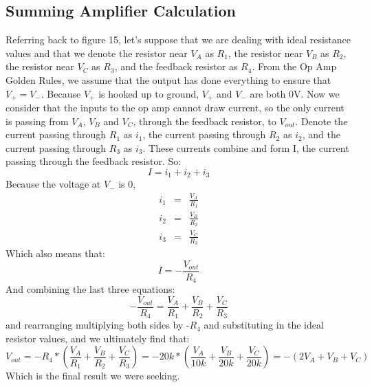 \documentclass{article}
\begin{document}
\subsection{Summing Amplifier Calculation}
    Referring back to figure 15, let's suppose that we are dealing with ideal resistance values and that we denote the resistor near $V_A$ as $R_1$, the resistor near $V_B$ as $R_2$, the resistor near $V_C$ as $R_3$, and the feedback resistor as $R_4$. From the Op Amp Golden Rules, we assume that the output has done everything to ensure that $V_+ = V_-$. Because $V_+$ is hooked up to ground, $V_+$ and $V_-$ are both 0V. Now we consider that the inputs to the op amp cannot draw current, so the only current is passing from $V_A$, $V_B$ and $V_C$, through the feedback resistor, to $V_{out}$. Denote the current passing through $R_1$ as $i_1$, the current passing through $R_2$ as $i_2$, and the current passing through $R_3$ as $i_3$. These currents combine and form I, the current passing through the feedback resistor. So:
    \begin{equation}
        I = i_1 + i_2 + i_3
    \end{equation}
    Because the voltage at $V_-$ is 0,\\
    \begin{equation}
        \begin{array}{lll}
            i_1 & = & \frac{V_A}{R_1}\\
            i_2 & = & \frac{V_B}{R_2}\\
            i_3 & = & \frac{V_C}{R_3}
        \end{array}
    \end{equation}
    Which also means that:
    \begin{equation}
        I = -\frac{V_{out}}{R_4}
    \end{equation}
    And combining the last three equations:
    \begin{equation}
        -\frac{V_{out}}{R_4} = \frac{V_A}{R_1} + \frac{V_B}{R_2} + \frac{V_C}{R_3}
    \end{equation}
    and rearranging multiplying both sides by -$R_4$ and substituting in the ideal resistor values, and we ultimately find that:
    \begin{equation}
        V_{out} = -R_4 * (\frac{V_A}{R_1} + \frac{V_B}{R_2} + \frac{V_C}{R_3}) = -20k * (\frac{V_A}{10k} + \frac{V_B}{20k} + \frac{V_C}{20k}) = -(2V_A + V_B + V_C)
    \end{equation}
    Which is the final result we were seeking.
\end{document}
